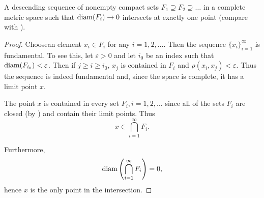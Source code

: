 \begin{theorem}\label{thm:cantors_nested_compact_theorem}
  A descending sequence of nonempty compact sets \( F_1 \supseteq F_2 \supseteq \ldots \) in a complete metric space such that \( \operatorname{diam}(F_i) \to 0 \) intersects at exactly one point (compare with ).
\end{theorem}
\begin{proof}
  Choose\AOC an element \( x_i \in F_i \) for any \( i = 1, 2, \ldots \). Then the sequence \( \{ x_i \}_{i=1}^\infty \) is fundamental. To see this, let \( \varepsilon > 0 \) and let \( i_0 \) be an index such that \( \operatorname{diam}(F_{i_0}) < \varepsilon \). Then if \( j \geq i \geq i_0 \), \( x_j \) is contained in \( F_i \) and \( \rho(x_i, x_j) < \varepsilon \). Thus the sequence is indeed fundamental and, since the space is complete, it has a limit point \( x \).

  The point \( x \) is contained in every set \( F_i, i = 1, 2, \ldots \) since all of the sets \( F_i \) are closed (by ) and contain their limit points. Thus
  \begin{equation*}
    x \in \bigcap_{i=1}^\infty F_i.
  \end{equation*}

  Furthermore,
  \begin{equation*}
    \operatorname{diam}\left( \bigcap_{i=1}^\infty F_i \right) = 0,
  \end{equation*}
  hence \( x \) is the only point in the intersection.
\end{proof}

